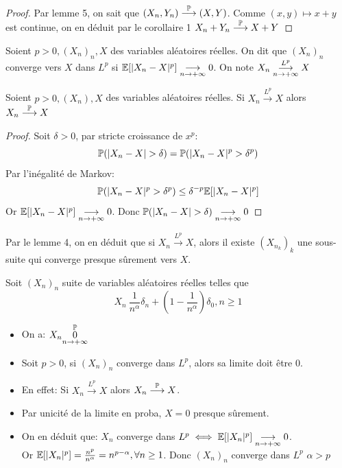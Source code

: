 \documentclass[]{report}
\begin{document}
    \begin{proof}
        Par lemme 5, on sait que $(X_n,Y_n)\overset{\mathbb{P}}{\longrightarrow}(X,Y)$. Comme $(x,y)\mapsto x+y$ est continue, on en déduit par le corollaire 1 $X_n+Y_n \overset{\mathbb{P}}{\longrightarrow} X+Y$
    \end{proof}

    \begin{df}{}{}
        Soient $p>0,(X_n)_n,X$ des variables aléatoires réelles. On dit que $(X_n)_n$ converge vers $X$ dans $L^p$ si $\mathbb{E}[|X_n-X|^p]\underset{n\to +\infty}{\longrightarrow}0$. On note $X_n\overunderset{L^p}{n\to+\infty}{\longrightarrow}X$
    \end{df}

    \begin{prop}{}{}
        Soient $p>0,(X_n),X$ des variables aléatoires réelles. Si $X_n\overset{L^p}{\longrightarrow} X$ alors $X_n\overset{\mathbb{P}}{\longrightarrow}X$
    \end{prop}

    \begin{proof}
        Soit $\delta>0$, par stricte croissance de $x^p$:
        \[\Pa (|X_n-X|>\delta)=\Pa(|X_n-X|^p>\delta^p)\]
        Par l'inégalité de Markov:
        \[\mathbb{P}(|X_n-X|^p>\delta^p)\le \delta^{-p}\mathbb{E}[|X_n-X|^p]\]
        Or $\mathbb{E}[|X_n-X|^p]\underset{n\to +\infty}{\longrightarrow} 0$. Donc $\Pa(|X_n-X|>\delta)\underset{n\to +\infty}{\longrightarrow}0$
    \end{proof}

    \begin{re}{}{}
        Par le lemme 4, on en déduit que si $X_n\overset{L^p}{\longrightarrow}X$, alors il existe $(X_{n_k})_k$ une sous-suite qui converge presque sûrement vers $X$.
    \end{re}

    \begin{ex}{}{}
        Soit $(X_n)_n$ suite de variables aléatoires réelles telles que
        \[X_n~ \frac{1}{n^\alpha}\delta_n+(1-\frac{1}{n^\alpha})\delta_0,n\ge 1\]
        \begin{itemize}
            \item On a: $X_n\overunderset{\Pa}{n\to +\infty}{0}$
            \item Soit $p>0$, si $(X_n)_n$ converge dans $L^p$, alors sa limite doit être $0$.
            \item En effet: Si $X_n\overset{L^p}{\longrightarrow}X$ alors $X_n\overset{\mathbb{P}}{\longrightarrow}X$.
            \item Par unicité de la limite en proba, $X=0$ presque sûrement.
            \item On en déduit que: $X_n$ converge dans $L^p \iff \mathbb{E}[|X_n|^p]\underset{n\to +\infty}{\longrightarrow} 0$.\\
            Or $\mathbb{E}[|X_n|^p]=\frac{n^p}{n^\alpha}=n^{p-\alpha},\forall n\ge 1$. Donc $(X_n)_n$ converge dans $L^p$ \ssi $\alpha>p$
        \end{itemize}
    \end{ex}
\end{document}
